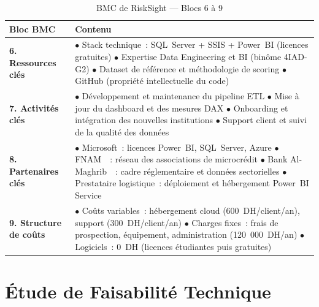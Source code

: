 \documentclass[12pt, a4paper]{report}
\begin{document}
\begin{table}[H]
\centering
\caption{BMC de RiskSight --- Blocs 6 à 9}
\label{tab:bmc_6789}
\renewcommand{\arraystretch}{1.5}
\begin{tabularx}{\textwidth}{p{4cm} X}
\toprule
\rowcolor{primary!12}
Bloc BMC & Contenu \\
\midrule
\textbf{6. Ressources clés} &
  $\bullet$ Stack technique~: SQL~Server + SSIS + Power~BI (licences gratuites) \newline
  $\bullet$ Expertise Data Engineering et BI (binôme 4IAD-G2) \newline
  $\bullet$ Dataset de référence et méthodologie de scoring \newline
  $\bullet$ GitHub (propriété intellectuelle du code) \\
\midrule
\textbf{7. Activités clés} &
  $\bullet$ Développement et maintenance du pipeline ETL \newline
  $\bullet$ Mise à jour du dashboard et des mesures DAX \newline
  $\bullet$ Onboarding et intégration des nouvelles institutions \newline
  $\bullet$ Support client et suivi de la qualité des données \\
\midrule
\textbf{8. Partenaires clés} &
  $\bullet$ Microsoft~: licences Power~BI, SQL~Server, Azure \newline
  $\bullet$ FNAM~\cite{fnam}~: réseau des associations de microcrédit \newline
  $\bullet$ Bank Al-Maghrib~\cite{bam_rapport}~: cadre réglementaire et données sectorielles \newline
  $\bullet$ Prestataire logistique~: déploiement et hébergement Power~BI Service \\
\midrule
\textbf{9. Structure de coûts} &
  $\bullet$ Coûts variables~: hébergement cloud (600~DH/client/an), support (300~DH/client/an) \newline
  $\bullet$ Charges fixes~: frais de prospection, équipement, administration (120~000~DH/an) \newline
  $\bullet$ Logiciels~: 0~DH (licences étudiantes puis gratuites) \\
\bottomrule
\end{tabularx}
\end{table}

\newpage
\section{Étude de Faisabilité Technique}
\end{document}
